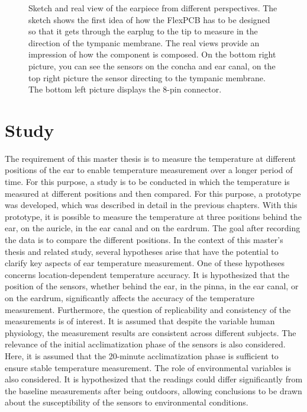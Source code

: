 \begin{figure}[!h]
    \caption{Sketch and real view of the earpiece from different perspectives.
The sketch shows the first idea of how the FlexPCB has to be designed so that it gets through the earplug to the tip to measure in the direction of the tympanic membrane. The real views provide an impression of how the component is composed. On the bottom right picture, you can see the sensors on the concha and ear canal, on the top right picture the sensor directing to the tympanic membrane. The bottom left picture displays the 8-pin connector.}
    \label{fig:design:prototype_earpiece_views}
\end{figure}

\section{Study}
\label{ch:Design:Study}
The requirement of this master thesis is to measure the temperature at different positions of the ear to enable temperature measurement over a longer period of time. 
For this purpose, a study is to be conducted in which the temperature is measured at different positions and then compared. 
For this purpose, a prototype was developed, which was described in detail in the previous chapters. 
With this prototype, it is possible to measure the temperature at three positions behind the ear, on the auricle, in the ear canal and on the eardrum.
The goal after recording the data is to compare the different positions. 
In the context of this master's thesis and related study, several hypotheses arise that have the potential to clarify key aspects of ear temperature measurement. 
One of these hypotheses concerns location-dependent temperature accuracy. It is hypothesized that the position of the sensors, whether behind the ear, in the pinna, in the ear canal, or on the eardrum, significantly affects the accuracy of the temperature measurement.
Furthermore, the question of replicability and consistency of the measurements is of interest. It is assumed that despite the variable human physiology, the measurement results are consistent across different subjects. The relevance of the initial acclimatization phase of the sensors is also considered. Here, it is assumed that the 20-minute acclimatization phase is sufficient to ensure stable temperature measurement. 
The role of environmental variables is also considered. 
It is hypothesized that the readings could differ significantly from the baseline measurements after being outdoors, allowing conclusions to be drawn about the susceptibility of the sensors to environmental conditions. 
